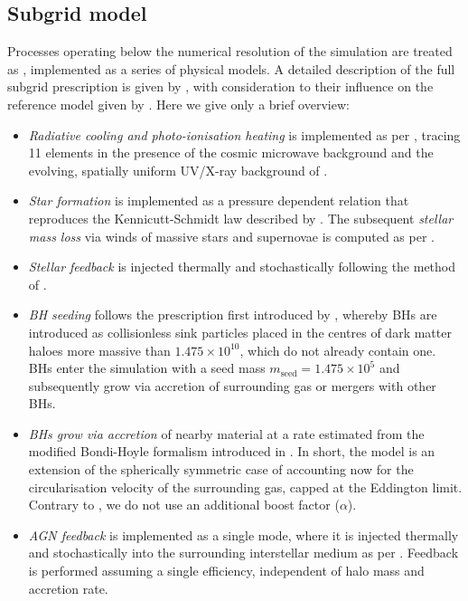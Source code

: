 \subsection{Subgrid model}

Processes operating below the numerical resolution of the simulation are
treated as , implemented as a series of physical models. A
detailed description of the full subgrid prescription is given by
\citet{Schaye2015}, with consideration to their influence on the reference
model given by \cite{Crain2015}. Here we give only a brief overview:

\begin{itemize}

\item \textit{Radiative cooling and photo-ionisation heating} is implemented as
per \citet{Wiersma2009a}, tracing 11 elements in the presence of the cosmic
microwave background and the evolving, spatially uniform UV/X-ray background of
\citet{HaardtandMadau2001}. 

\item \textit{Star formation} is implemented as a pressure dependent relation
that reproduces the Kennicutt-Schmidt law described by
\citet{Schaye_DallaVecchia2008}. The subsequent \textit{stellar mass loss} via
winds of massive stars and supernovae is computed as per \citet{Wiersma2009b}. 

\item \textit{Stellar feedback} is injected thermally and stochastically
following the method of \citet{DallaVecchia_Schaye2012}.

\item \textit{BH seeding} follows the prescription first introduced by
\citet{Springel2005a}, whereby BHs are introduced as collisionless sink
particles placed in the centres of dark matter haloes more massive than $1.475
\times 10^{10}$\Msol, which do not already contain one. BHs enter the
simulation with a seed mass $m_{\mathrm{seed}} = 1.475 \times 10^{5}$\Msol
and subsequently grow via accretion of surrounding gas or mergers with other
BHs.

\item \textit{BHs grow via accretion} of nearby material at a rate estimated
from the modified Bondi-Hoyle formalism introduced in \citet{RosasGuevara2015}.
In short, the model is an extension of the spherically symmetric case of
\citet{Bondi1944} accounting now for the circularisation velocity of the
surrounding gas, capped at the Eddington limit. Contrary to
\citet{RosasGuevara2015}, we do not use an additional boost factor ($\alpha$).

\item \textit{AGN feedback} is implemented as a single mode, where it is
injected thermally and stochastically into the surrounding interstellar medium
as per \citet{Booth_Schaye2009}. Feedback is performed assuming a single
efficiency, independent of halo mass and accretion rate. 

\end{itemize}

